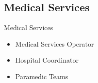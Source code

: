 \subsection{Medical Services}
\begin{frame}{Medical Services}
    \begin{itemize}
        \item Medical Services Operator
        \item Hospital Coordinator
        \item Paramedic Teams
    \end{itemize}
\end{frame} 